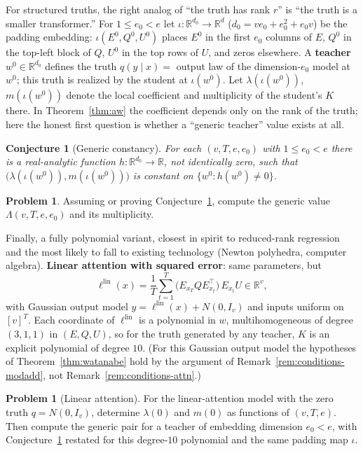\documentclass[11pt]{amsart}
\theoremstyle{plain}
\newtheorem{conjecture}[theorem]{Conjecture}
\theoremstyle{definition}
\newtheorem{problem}[theorem]{Problem}
\newcommand{\R}{\mathbb{R}}
\begin{document}
For structured truths, the right analog of ``the truth has rank $r$'' is ``the truth is a smaller transformer.'' For $1 \le e_0 < e$ let $\iota \colon \R^{d_0} \to \R^d$ ($d_0 = ve_0 + e_0^2 + e_0 v$) be the padding embedding: $\iota(E^0, Q^0, U^0)$ places $E^0$ in the first $e_0$ columns of $E$, $Q^0$ in the top-left block of $Q$, $U^0$ in the top rows of $U$, and zeros elsewhere. A \textbf{teacher} $w^0 \in \R^{d_0}$ defines the truth $q(y \mid x) = $ output law of the dimension-$e_0$ model at $w^0$; this truth is realized by the student at $\iota(w^0)$. Let $\lambda(\iota(w^0))$, $m(\iota(w^0))$ denote the local coefficient and multiplicity of the student's $K$ there. In Theorem~\ref{thm:aw} the coefficient depends only on the rank of the truth; here the honest first question is whether a ``generic teacher'' value exists at all.

\begin{conjecture}[Generic constancy]\label{conj:generic}
For each $(v, T, e, e_0)$ with $1 \le e_0 < e$ there is a real-analytic function $h \colon \R^{d_0} \to \R$, not identically zero, such that $\bigl(\lambda(\iota(w^0)), m(\iota(w^0))\bigr)$ is constant on $\{w^0 : h(w^0) \neq 0\}$.
\end{conjecture}

\begin{problem}\label{prob:attn-teacher}
Assuming or proving Conjecture~\ref{conj:generic}, compute the generic value $\Lambda(v, T, e, e_0)$ and its multiplicity.
\end{problem}

Finally, a fully polynomial variant, closest in spirit to reduced-rank regression and the most likely to fall to existing technology (Newton polyhedra, computer algebra). \textbf{Linear attention with squared error}: same parameters, but
\[
   \ell^{\mathrm{lin}}(x) = \frac1T \sum_{t=1}^{T} \bigl(E_{x_T} Q E_{x_t}^{\!\top}\bigr)\, E_{x_t} U \in \R^v,
\]
with Gaussian output model $y = \ell^{\mathrm{lin}}(x) + N(0, I_v)$ and inputs uniform on $[v]^T$. Each coordinate of $\ell^{\mathrm{lin}}$ is a polynomial in $w$, multihomogeneous of degree $(3,1,1)$ in $(E, Q, U)$, so for the truth generated by any teacher, $K$ is an explicit polynomial of degree $10$. (For this Gaussian output model the hypotheses of Theorem~\ref{thm:watanabe} hold by the argument of Remark~\ref{rem:conditions-modadd}, not Remark~\ref{rem:conditions-attn}.)

\begin{problem}[Linear attention]\label{prob:linear-attn}
For the linear-attention model with the zero truth $q=N(0,I_v)$, determine $\lambda(0)$ and $m(0)$ as functions of $(v,T,e)$. Then compute the generic pair for a teacher of embedding dimension $e_0<e$, with Conjecture~\textup{\ref{conj:generic}} restated for this degree-$10$ polynomial and the same padding map $\iota$.
\end{problem}
\end{document}

